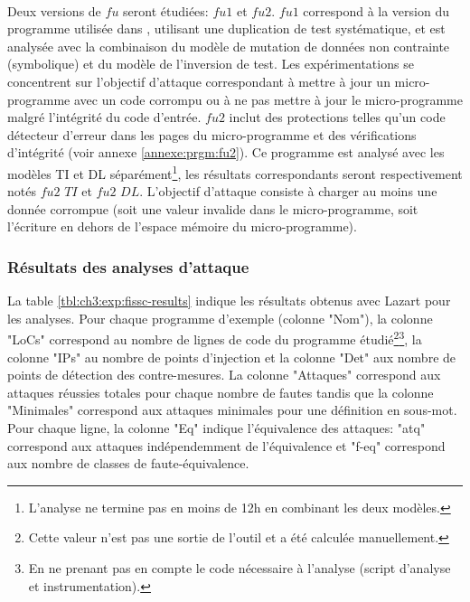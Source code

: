                 \paragraph{}
    
                Deux versions de $fu$ seront étudiées: $fu1$ et $fu2$.
                $fu1$ correspond à la version du programme utilisée dans \cite{Boespflug/FDTC20}, utilisant une duplication de test systématique, et est analysée avec la combinaison du modèle de mutation de données non contrainte (symbolique) et du modèle de l'inversion de test. 
                Les expérimentations se concentrent sur l'objectif d'attaque correspondant à mettre à jour un micro-programme avec un code corrompu ou à ne pas mettre à jour le micro-programme malgré l'intégrité du code d'entrée.
                $fu2$ inclut des protections telles qu'un code détecteur d'erreur dans les pages du micro-programme et des vérifications d'intégrité (voir annexe \ref{annexe:prgm:fu2}).
                Ce programme est analysé avec les modèles \gls{TI} et \gls{DL} séparément\footnote{L'analyse ne termine pas en moins de 12h en combinant les deux modèles.}, les résultats correspondants seront respectivement notés $fu2$ $TI$ et $fu2$ $DL$. L'objectif d'attaque consiste à charger au moins une donnée corrompue (soit une valeur invalide dans le micro-programme, soit l'écriture en dehors de l'espace mémoire du micro-programme).
                
            \subsubsection{Résultats des analyses d'attaque}
            \label{sec:lz:exp:aar}
                
                La table \ref{tbl:ch3:exp:fissc-results} indique les résultats obtenus avec Lazart pour les analyses.
                Pour chaque programme d'exemple (colonne "Nom"), la colonne "LoCs" correspond au nombre de lignes de code du programme étudié\footnote{Cette valeur n'est pas une sortie de l'outil et a été calculée manuellement.}\footnote{En ne prenant pas en compte le code nécessaire à l'analyse (script d'analyse et instrumentation).}, la colonne "IPs" au nombre de points d'injection et la colonne "Det" aux nombre de points de détection des contre-mesures.
                La colonne "Attaques" correspond aux attaques réussies totales pour chaque nombre de fautes tandis que la colonne "Minimales" correspond aux attaques minimales pour une définition en sous-mot.
                Pour chaque ligne, la colonne "Eq" indique l'équivalence des attaques: "atq" correspond aux attaques indépendemment de l'équivalence et "f-eq" correspond aux nombre de classes de faute-équivalence.
                
